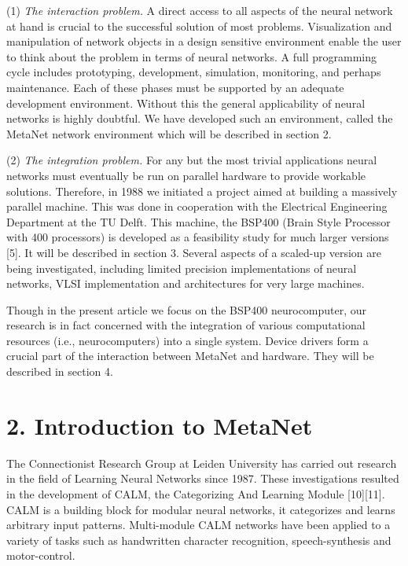 \documentclass[11pt, a4paper]{article}
\begin{document}
(1) \textit{The interaction problem.} A direct access to all aspects of the neural network at hand is crucial to the successful solution of most problems. Visualization and manipulation of network objects in a design sensitive environment enable the user to think about the problem in terms of neural networks. A full programming cycle includes prototyping, development, simulation, monitoring, and perhaps maintenance. Each of these phases must be supported by an adequate development environment. Without this the general applicability of neural networks is highly doubtful. We have developed such an environment, called the MetaNet network environment which will be described in section 2.

(2) \textit{The integration problem.} For any but the most trivial applications neural networks must eventually be run on parallel hardware to provide workable solutions. Therefore, in 1988 we initiated a project aimed at building a massively parallel machine. This was done in cooperation with the Electrical Engineering Department at the TU Delft. This machine, the BSP400 (Brain Style Processor with 400 processors) is developed as a feasibility study for much larger versions [5]. It will be described in section 3. Several aspects of a scaled-up version are being investigated, including limited precision implementations of neural networks, VLSI implementation and architectures for very large machines.

Though in the present article we focus on the BSP400 neurocomputer, our research is in fact concerned with the integration of various computational resources (i.e., neurocomputers) into a single system. Device drivers form a crucial part of the interaction between MetaNet and hardware. They will be described in section 4.

\section*{\color{navyaccent} 2. Introduction to MetaNet}

The Connectionist Research Group at Leiden University has carried out research in the field of Learning Neural Networks since 1987. These investigations resulted in the development of CALM, the Categorizing And Learning Module [10][11]. CALM is a building block for modular neural networks, it categorizes and learns arbitrary input patterns. Multi-module CALM networks have been applied to a variety of tasks such as handwritten character recognition, speech-synthesis and motor-control.
\end{document}
